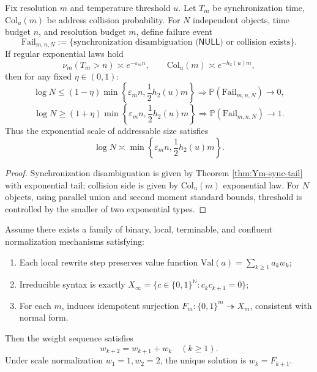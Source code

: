 \begin{theorem}\label{thm:xi-time-resolution-dual-budget-phase-transition}
Fix resolution \(m\) and temperature threshold \(u\).
Let \(T_m\) be synchronization time, \(\mathrm{Col}_u(m)\) be address collision probability.
For \(N\) independent objects, time budget \(n\), and resolution budget \(m\), define failure event
\[
\mathrm{Fail}_{m,n,N}:=\{\text{synchronization disambiguation (\(\mathsf{NULL}\)) or collision exists}\}.
\]
If regular exponential laws hold
\[
\nu_m(T_m>n)\asymp e^{-\varepsilon_m n},
\qquad
\mathrm{Col}_u(m)\asymp e^{-h_2(u)m},
\]
then for any fixed \(\eta\in(0,1)\):
\[
\log N\le (1-\eta)\min\!\left\{\varepsilon_m n,\frac12 h_2(u)m\right\}
\Longrightarrow
\mathbb P(\mathrm{Fail}_{m,n,N})\to 0,
\]
\[
\log N\ge (1+\eta)\min\!\left\{\varepsilon_m n,\frac12 h_2(u)m\right\}
\Longrightarrow
\mathbb P(\mathrm{Fail}_{m,n,N})\to 1.
\]
Thus the exponential scale of addressable size satisfies
\[
\log N\asymp \min\!\left\{\varepsilon_m n,\frac12 h_2(u)m\right\}.
\]
\end{theorem}

\begin{proof}
Synchronization disambiguation is given by Theorem \ref{thm:Ym-sync-tail} with exponential tail; collision side is given by \(\mathrm{Col}_u(m)\) exponential law.
For \(N\) objects, using parallel union and second moment standard bounds, threshold is controlled by the smaller of two exponential types.
\end{proof}

\begin{proposition}\label{prop:xi-local-binary-normalization-fibonacci-rigidity}
Assume there exists a family of binary, local, terminable, and confluent normalization mechanisms satisfying:
\begin{enumerate}
  \item Each local rewrite step preserves value function \(\mathrm{Val}(a)=\sum_{k\ge 1}a_k w_k\);
  \item Irreducible syntax is exactly \(X_\infty=\{c\in\{0,1\}^{\mathbb N}:c_kc_{k+1}=0\}\);
  \item For each \(m\), induces idempotent surjection \(F_m:\{0,1\}^m\twoheadrightarrow X_m\), consistent with normal form.
\end{enumerate}
Then the weight sequence satisfies
\[
w_{k+2}=w_{k+1}+w_k\quad(k\ge 1).
\]
Under scale normalization \(w_1=1,w_2=2\), the unique solution is \(w_k=F_{k+1}\).
\end{proposition}

